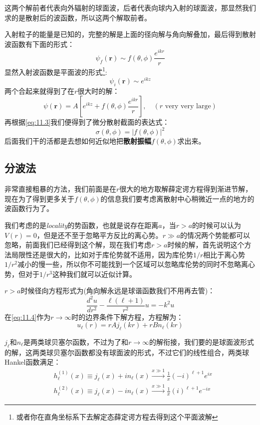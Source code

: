 \documentclass[a4paper,zihao=-4,linespread=1]{ctexrep}
\begin{document}
	这两个解前者代表向外辐射的球面波，后者代表向球内入射的球面波，那显然我们求的是散射后的波函数，所以这两个解取前者。
	
	入射粒子的能量是已知的，完整的解是上面的径向解与角向解叠加，最后得到散射波函数有下面的形式：
	\[\psi_f(\mathbf{r})\sim f(\theta,\phi)\frac{e^{ikr}}{r}\]
	显然入射波函数是平面波的形式\footnote{或者你在直角坐标系下去解定态薛定谔方程去得到这个平面波解}:
	\[\psi_i(\mathbf{r})\sim e^{ikz}\]
	两个合起来就得到了在$r$很大时的解：
	\begin{equation}
		\label{eq:11.4}
		\psi(\mathbf{r})=A\left[e^{ikz}+f(\theta,\phi)\frac{e^{ikr}}{r}\right],\quad (\text{$r$ very very large})
	\end{equation}
	再根据\ref{eq:11.3}我们便得到了微分散射截面的表达式：
	\begin{equation}
		\boxed{\sigma(\theta,\phi)=\left|f(\theta,\phi)\right|^2}
	\end{equation}
	后面我们干的活都是去想如何近似地把\textbf{散射振幅}$f(\theta,\phi)$求出来。
	\subsection{分波法}
	非常直接粗暴的方法，我们前面是在$r$很大的地方取解薛定谔方程得到渐进节解，现在为了得到更多关于$f(\theta,\phi)$的信息我们要考虑离散射中心稍微近一点的地方的波函数行为了。
	
	我们考虑的是{\itshape locality}的势函数，也就是说存在距离$a$，当$r>a$的时候可以认为$V(r)=0$，但是还不至于忽略平方反比的离心势。$r\gg a$的情况两个势能都可以忽略，前面我们已经得到这个解，现在我们考虑$r>a$时候的解，首先说明这个方法局限性还是很大的，比如对于库伦势就不适用，因为库伦势$1/r$相比于离心势$1/r^2$减小的慢一些，所以你不可能找到一个区域可以忽略库伦势的同时不忽略离心势，但对于$1/r^3$这种我们就可以近似计算。
	
	$r>a$时候径向方程形式为(角向解永远是球谐函数我们不用再去管)：
	\begin{equation}
		\label{eq:11.6}
		\frac{d^2u}{dr^2}-\frac{\ell(\ell+1)}{r^2}u=-k^2u
	\end{equation}
	在\ref{eq:11.4}作为$r\to\infty$时的边界条件下解方程，方程解为：
	\[u_\ell(r)=rAj_\ell(kr)+rBn_\ell(kr)\]
	
	$j_\ell$和$n_\ell$是两类球贝塞尔函数，不过为了和$r\to\infty$的解衔接，我们要的是球面波形式的解，这两类球贝塞尔函数都没有球面波的形式，不过它们的线性组合，两类球Hankel函数满足：
	\begin{align*}
	&h^{(1)}_\ell(x)\equiv j_\ell(x)+in_\ell(x)\xrightarrow{x\gg1}\frac{1}{x}(-i)^{\ell+1}e^{ix}\\
	&h^{(2)}_\ell(x)\equiv j_\ell(x)-in_\ell(x)\xrightarrow{x\gg1}\frac{1}{x}(i)^{\ell+1}e^{-ix}
	\end{align*}
	
\end{document}

